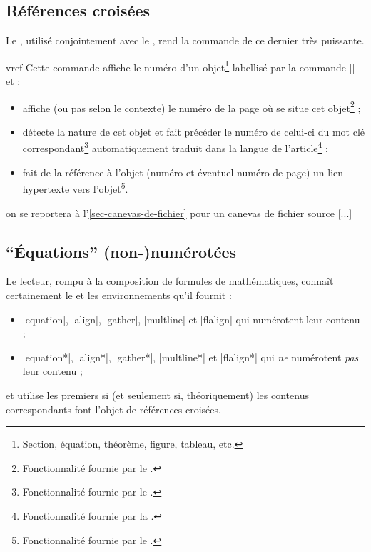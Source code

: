 \documentclass[french,nolocaltoc]{nwejmart}
\newtheorem[title=Fait,style=definition]{fact}
\begin{document}
\subsection{Références croisées}
\label{sec-references-croisees}

Le , utilisé conjointement avec le , rend la
commande  de ce dernier très puissante.

\begin{docCommand}{vref}{}
  Cette commande affiche le numéro d'un objet\footnote{Section, équation,
    théorème, figure, tableau, etc.} labellisé par la commande
  |\label{|\meta{label}|}| et :
  \begin{itemize}
  \item affiche (ou pas selon le contexte) le numéro de la page où se situe cet
    objet\footnote{Fonctionnalité fournie par le .} ;
  \item détecte la nature de cet objet et fait précéder le numéro de celui-ci du
    mot clé correspondant\footnote{Fonctionnalité fournie par le
      .} automatiquement traduit dans la langue de
    l'article\footnote{Fonctionnalité fournie par la \nwejmauthorcl.} ;
  \item fait de la référence à l'objet (numéro et éventuel numéro de page) un
    lien hypertexte vers l'objet\footnote{Fonctionnalité fournie par le
      .}.
  \end{itemize}
\begin{bodycode} on se reportera à l'\vref{sec-canevas-de-fichier} pour un
canevas de fichier source [...]
\end{bodycode}
\end{docCommand}


\subsection{\enquote{Équations} (non-)numérotées}
\label{sec:equat-non-numer}

Le lecteur, rompu à la composition de formules de mathématiques, connaît
certainement le  et les environnements qu'il fournit :
\begin{itemize}
\item |equation|, |align|, |gather|, |multline| et |flalign| qui numérotent
  leur contenu ;
\item |equation*|, |align*|, |gather*|, |multline*| et |flalign*| qui \emph{ne}
  numérotent \emph{pas} leur contenu ;
\end{itemize}
et utilise les premiers si (et seulement si, théoriquement) les contenus
correspondants font l'objet de références croisées.
\end{document}
